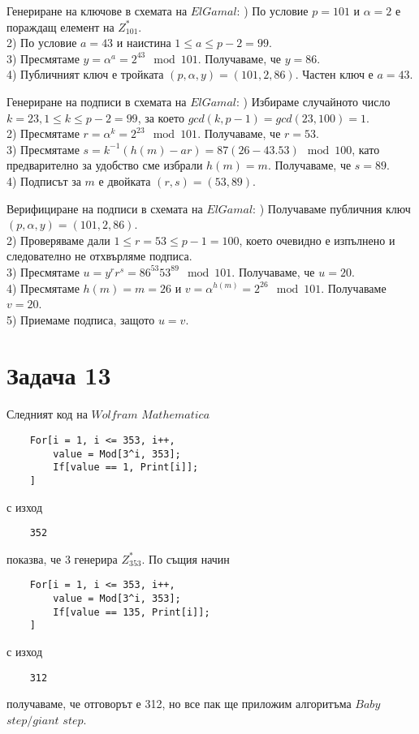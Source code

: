 \documentclass{article}
\begin{document}
\justify
$\textit{Генериране на ключове в схемата на ElGamal:}$ 
) По условие $p = 101$ и $\alpha = 2$ е пораждащ елемент на $Z_{101}^*$. \\
2) По условие $a = 43$ и наистина $1 \leq a \leq p-2=99$. \\
3) Пресмятаме $y = \alpha ^ a = 2^{43} \mod 101$. Получаваме, че $y = 86$. \\
4) Публичният ключ е тройката $(p,\alpha,y) = (101,2,86)$. Частен ключ е $a = 43$.

\justify
$\textit{Генериране на подписи в схемата на ElGamal:}$
) Избираме случайното число $k = 23, 1 \leq k \leq p-2=99$, за което $gcd(k,p-1) = gcd(23,100) = 1$.\\
2) Пресмятаме $r = \alpha ^ k = 2 ^ {23} \mod 101$. Получаваме, че $ r = 53$.\\
3) Пресмятаме $s = k^{-1}(h(m) - ar) = 87(26-43.53) \mod 100$, като предварително за удобство сме избрали $h(m) = m$. Получаваме, че $s = 89$. \\
4) Подписът за $m$ е двойката $(r,s) = (53,89)$.

\justify
$\textit{Верифициране на подписи в схемата на ElGamal:}$
) Получаваме публичния ключ $(p,\alpha,y) = (101,2,86)$. \\
2) Проверяваме дали $1 \leq r = 53 \leq p-1=100$, което очевидно е изпълнено и следователно не отхвърляме подписа. \\
3) Пресмятаме $u = y^r r^s = 86^{53} 53^{89} \mod 101$. Получаваме, че $u = 20$. \\
4) Пресмятаме $h(m) = m = 26$ и $v = \alpha ^ {h(m)} = 2 ^ {26} \mod 101$. Получаваме $v = 20$. \\ 
5) Приемаме подписа, защото $u = v$.

\section*{Задача 13}

\justify
Следният код на $Wolfram$ $Mathematica$ 
\begin{verbatim}
    For[i = 1, i <= 353, i++,
        value = Mod[3^i, 353];
        If[value == 1, Print[i]];
    ]
\end{verbatim}
с изход 
\begin{verbatim}
    352
\end{verbatim}
показва, че 3 генерира $Z^*_{353}$. По същия начин 
\begin{verbatim}
    For[i = 1, i <= 353, i++,
        value = Mod[3^i, 353];
        If[value == 135, Print[i]];
    ]
\end{verbatim}
с изход 
\begin{verbatim}
    312
\end{verbatim}
получаваме, че отговорът е 312, но все пак ще приложим алгоритъма $Baby$ $step/giant$ $step$.
\end{document}
